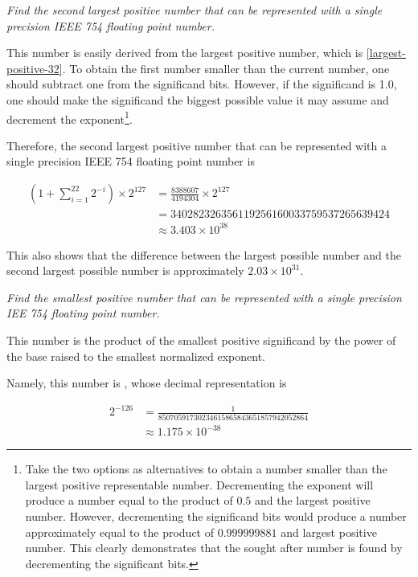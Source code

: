 \documentclass[oneside]{book} %
\theoremstyle{plain}
\newcommand*\FormatAsSignBit[1]{\texttt{\textcolor{SignBitColor}{#1}}}
\newcommand*\FormatAsExponentBits[1]{\texttt{\textcolor{ExponentBitsColor}{#1}}}
\newcommand*\FormatAsSignificandBits[1]{\texttt{\textcolor{SignificandBitsColor}{#1}}}
\newcommand*\singleprecision[1]{\StrSplit{#1}{1}{\signbit}{\tail}\StrSplit{\tail}{8}{\exponentbits}{\significandbits}\FormatAsSignBit{\signbit}
\FormatAsExponentBits{\exponentbits}
\FormatAsSignificandBits{\significandbits}}
\begin{document}
\textit{Find the second largest positive number that can be represented with a
single precision IEEE 754 floating point number.}

This number is easily derived from the largest positive number, which is
\ref{largest-positive-32}. To obtain the first number smaller than the current
number, one should subtract one from the significand bits. However, if the
significand is 1.0, one should make the significand the biggest possible value
it may assume and decrement the exponent\footnote{Take the two options as
alternatives to obtain a number smaller than the largest positive representable
number. Decrementing the exponent will produce a number equal to the product of
\(0.5\) and the largest positive number. However, decrementing the significand
bits would produce a number approximately equal to the product of
\(0.999999881\) and largest positive number. This clearly demonstrates that the
sought after number is found by decrementing the significant bits.}.

Therefore, the second largest positive number that can be represented with a
single precision IEEE 754 floating point number is

\begin{align}
    \left(1 + \sum_{i=1}^{22} 2^{-i}\right) \times 2^{127}
    &= \frac{8388607}{4194304} \times 2^{127} \nonumber \\
    &= 340282326356119256160033759537265639424 \nonumber \\
    &\approx 3.403 \times 10^{38} \nonumber
\end{align}

This also shows that the difference between the largest possible number and the
second largest possible number is approximately \(2.03 \times 10^{31}\).

\textit{Find the smallest positive number that can be represented with a single
precision IEE 754 floating point number.}

This number is the product of the smallest positive significand by the power of
the base raised to the smallest normalized exponent.

Namely, this number is \singleprecision{00000000100000000000000000000000}, whose
decimal representation is

\begin{align}
    2^{-126}
    &= \frac{1}{85070591730234615865843651857942052864}
    \label{smallest-positive-32} \\
    &\approx 1.175 \times 10^{-38} \nonumber
\end{align}
\end{document}

